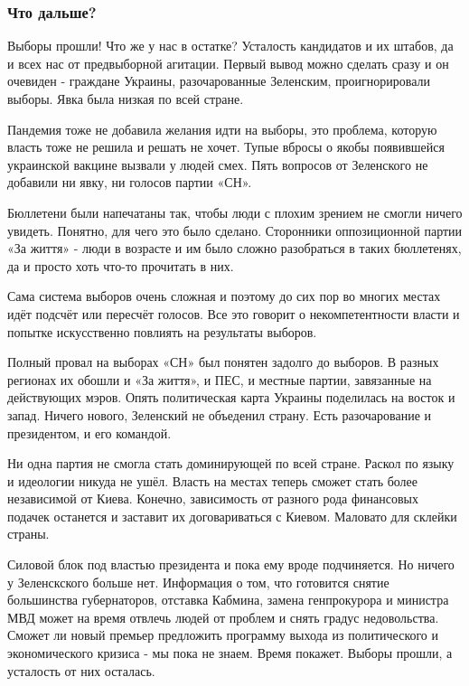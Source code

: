  
 
 

\subsubsection{Что дальше?}

Выборы прошли! Что же у нас в остатке? Усталость кандидатов и их штабов, да и
всех нас от предвыборной агитации. Первый вывод можно сделать сразу и он
очевиден - граждане Украины, разочарованные Зеленским, проигнорировали выборы.
Явка была низкая по всей стране. 

Пандемия тоже не добавила желания идти на выборы, это  проблема, которую власть
тоже не решила и решать не хочет. Тупые вбросы о якобы появившейся украинской
вакцине вызвали у людей смех. Пять вопросов от Зеленского не добавили ни явку,
ни голосов партии «СН».

Бюллетени были напечатаны так, чтобы люди с плохим зрением не смогли ничего
увидеть. Понятно, для чего это было сделано. Сторонники оппозиционной партии
«За життя» - люди в возрасте и им было сложно разобраться в таких бюллетенях,
да и просто хоть что-то прочитать в них.  

Сама система выборов очень сложная и поэтому до сих пор во многих местах идёт
подсчёт или пересчёт голосов. Все это говорит о некомпетентности власти и
попытке искусственно повлиять на результаты выборов.

Полный провал на выборах «СН» был понятен задолго до выборов.  В разных
регионах их обошли и «За життя», и ПЕС, и местные партии, завязанные на
действующих мэров. Опять политическая карта Украины поделилась на восток и
запад. Ничего нового, Зеленский не объеденил страну. Есть разочарование и
президентом, и его командой.  

Ни одна партия не смогла стать доминирующей по всей стране. Раскол по языку и
идеологии никуда не ушёл. Власть на местах теперь сможет стать более
независимой от Киева. Конечно, зависимость от разного рода финансовых подачек
останется и заставит их договариваться с Киевом.
Маловато для склейки страны. 

Силовой блок под властью президента и пока ему вроде подчиняется. Но ничего у
Зеленскского больше нет. Информация о том, что готовится снятие большинства
губернаторов, отставка Кабмина, замена генпрокурора и министра МВД может на
время отвлечь людей от проблем и снять градус недовольства. Сможет ли новый
премьер предложить программу выхода из политического и экономического кризиса -
мы пока не знаем. Время покажет.  Выборы прошли, а усталость от них осталась.

